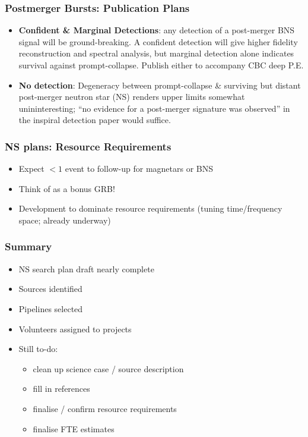 \documentclass{beamer}
\def\ns#1{neutron star#1 (NS#1)\gdef\ns{NS}}
\begin{document}
\begin{frame}
    \frametitle{Postmerger Bursts: Publication Plans}
    \begin{itemize}
        \item {\bf Confident \& Marginal Detections}: any detection of a
            post-merger BNS signal will be ground-breaking.  A confident
            detection will give higher fidelity reconstruction and spectral
            analysis, but marginal detection alone indicates survival against
            prompt-collapse.  Publish either to accompany CBC deep P.E.
        \item {\bf No detection}: Degeneracy between prompt-collapse \&
            surviving but distant post-merger \ns{} renders upper limits
            somewhat unininteresting; ``no evidence for a post-merger signature
            was observed'' in the inspiral detection paper would suffice.
    \end{itemize}
\end{frame}

\begin{frame}
    \frametitle{NS plans: Resource Requirements}
    \begin{itemize}
        \item Expect $<1$ event to follow-up for magnetars or BNS
        \item Think of as a bonus GRB!
        \item Development to dominate resource requirements (tuning
            time/frequency space; already underway)
    \end{itemize}
\end{frame}


\begin{frame}
    \frametitle{Summary}
    \begin{itemize}
    \item NS search plan draft nearly complete
    \item Sources identified
    \item Pipelines selected
    \item Volunteers assigned to projects
    \item Still to-do:
        \begin{itemize}
            \item clean up science case / source description
            \item fill in references
            \item finalise / confirm resource requirements
            \item finalise FTE estimates
        \end{itemize}
    \end{itemize}

\end{frame}
\end{document}
